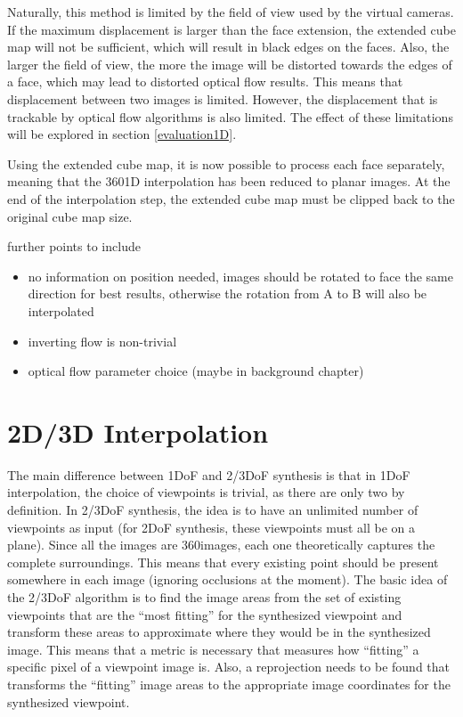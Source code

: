 Naturally, this method is limited by the field of view used by the virtual cameras. If the maximum displacement is larger than the face extension, the extended cube map will not be sufficient, which will result in black edges on the faces. Also, the larger the field of view, the more the image will be distorted towards the edges of a face, which may lead to distorted optical flow results. This means that displacement between two images is limited. However, the displacement that is trackable by optical flow algorithms is also limited. The effect of these limitations will be explored in section \ref{evaluation1D}.

Using the extended cube map, it is now possible to process each face separately, meaning that the 360\degree 1D interpolation has been reduced to planar images. At the end of the interpolation step, the extended cube map must be clipped back to the original cube map size.

further points to include
\begin{itemize}
\item no information on position needed, images should be rotated to face the same direction for best results, otherwise the rotation from A to B will also be interpolated
\item inverting flow is non-trivial
\item optical flow parameter choice (maybe in background chapter)
\end{itemize}


\section{2D/3D Interpolation}
The main difference between 1DoF and 2/3DoF synthesis is that in 1DoF interpolation, the choice of viewpoints is trivial, as there are only two by definition. In 2/3DoF synthesis, the idea is to have an unlimited number of viewpoints as input (for 2DoF synthesis, these viewpoints must all be on a plane). Since all the images are 360\degree images, each one theoretically captures the complete surroundings. This means that every existing point should be present somewhere in each image (ignoring occlusions at the moment).
The basic idea of the 2/3DoF algorithm is to find the image areas from the set of existing viewpoints that are the ``most fitting'' for the synthesized viewpoint and transform these areas to approximate where they would be in the synthesized image. This means that a metric is necessary that measures how ``fitting'' a specific pixel of a viewpoint image is. Also, a reprojection needs to be found that transforms the ``fitting'' image areas to the appropriate image coordinates for the synthesized viewpoint.

